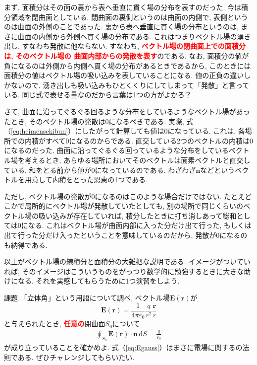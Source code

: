 まず, 面積分はその面の裏から表へ垂直に貫く場の分布を表すのだった. 
今は積分領域を閉曲面としている. 閉曲面の裏側というのは曲面の内側で, 表側というのは曲面の外側のことであった. 
裏から表へ垂直に貫く場の分布というのは, まさに曲面の内側から外側へ貫く場の分布である. 
これはつまりベクトル場の湧き出し, すなわち発散に他ならない. 
すなわち, \textbf{\textcolor{red}{ベクトル場の閉曲面上での面積分は, そのベクトル場の
曲面内部からの発散を表す}}のである. 
なお, 面積分の値が負になるのは外側から内側へ貫く場の分布があるときであるから, 
このときには面積分の値はベクトル場の吸い込みを表していることになる. 
値の正負の違いしかないので, 湧き出しも吸い込みもひとくくりにしてしまって「発散」と言っている. 
同じ式で表せる量なのだから言葉は1つの方がよかろ？ 

さて, 曲面に沿ってぐるぐる回るような分布をしているようなベクトル場があったとき, 
そのベクトル場の発散は0になるべきである. 
実際, 式（\ref{eq:heimensekibun}）にしたがって計算しても値は0になっている. 
これは, 各場所での内積がすべて0になるのからである. 直交している2つのベクトルの内積は0になるのだった. 
曲面に沿ってぐるぐる回っているような分布をしているベクトル場を考えるとき, 
あらゆる場所においてそのベクトルは面素ベクトルと直交している. 
和をとる前から値が0になっているのである. わざわざ$\bm{n}$などというベクトルを用意して内積をとった恩恵の1つである. 

ただし, ベクトル場の発散が0になるのはこのような場合だけではない. たとえどこかで局所的にベクトル場が発散していたとしても, 
別の場所で同じくらいのベクトル場の吸い込みが存在していれば, 積分したときに打ち消しあって総和としては0になる. 
これはベクトル場が曲面内部に入った分だけ出て行った, もしくは出て行った分だけ入ったということを意味しているのだから, 
発散が0になるのも納得である. 

以上がベクトル場の線積分と面積分の大雑把な説明である. 
イメージがついていれば, そのイメージはこういうものをがっつり数学的に勉強するときに大きな助けになる. 
それを実感してもらうために1つ演習をしよう. 
\begin{itembox}[l]{課題}
「立体角」という用語について調べ, ベクトル場$\bm{E}(\bm{r})$が
$$
\bm{E}(\bm{r}) = \frac{1}{4 \pi \varepsilon_0} \frac{q}{r^2} \frac{\bm{r}}{r}
$$
と与えられたとき, \textbf{\textcolor{red}{任意の}}閉曲面$S_0$について
\begin{eqnarray}
\oint_{S_0} \bm{E}(\bm{r}) \cdot \bm{n} \, \mathrm{d}S = \frac{q}{\varepsilon_0}
\label{eq:Egauss}
\end{eqnarray}
が成り立っていることを確かめよ. 
式（\ref{eq:Egauss}）はまさに電場に関するの法則である. ぜひチャレンジしてもらいたい. 
\end{itembox} 
